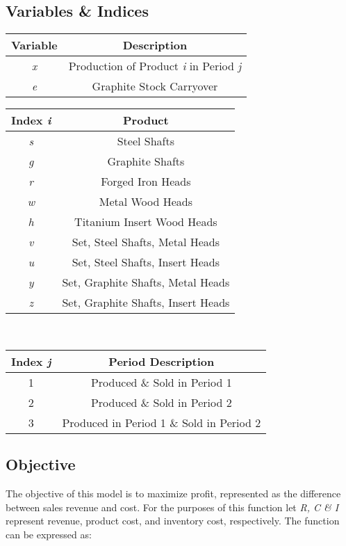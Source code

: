 \documentclass{article}
\begin{document}
\subsection{Variables \& Indices}
\begin{tabular}{ |c | c| }
\hline
\textbf{Variable} & \textbf{Description} \\
\hline
\textit{x} & Production of Product \textit{i} in Period \textit{j} \\
\textit{e} & Graphite Stock Carryover \\
\hline
\end{tabular}
\vspace{5mm}

\noindent
\begin{tabular}{| c | c |}
\hline
\textbf{Index \textit{i}} & \textbf{Product} \\
\hline
\textit{s} & Steel Shafts \\
\textit{g} & Graphite Shafts \\
\textit{r} & Forged Iron Heads \\
\textit{w} & Metal Wood Heads \\
\textit{h} & Titanium Insert Wood Heads \\
\textit{v} & Set, Steel Shafts, Metal Heads \\
\textit{u} & Set, Steel Shafts, Insert Heads \\
\textit{y} & Set, Graphite Shafts, Metal Heads \\
\textit{z} & Set, Graphite Shafts, Insert Heads \\
\hline
\end{tabular}
\vspace{5mm}
\\
\begin{tabular}{ | c | c | }
\hline
\textbf{Index \textit{j}} & \textbf{Period Description} \\
\hline
1 & Produced \& Sold in Period 1 \\
2 & Produced \& Sold in Period 2 \\
3 & Produced in Period 1 \& Sold in Period 2 \\
\hline
\end{tabular}

\subsection{Objective}
The objective of this model is to maximize profit, represented as the difference between sales revenue and cost.  For the purposes of this function let \textit{R, C \& I} represent revenue, product cost, and inventory cost, respectively.  The function can be expressed as:
\end{document}

